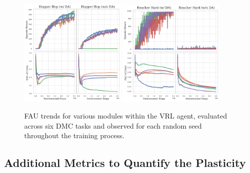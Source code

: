 \begin{figure}[ht]
  \includegraphics[width=0.45\textwidth]{Figures/5Appendix/sing_UTD_hopper_hop.pdf}
  \includegraphics[width=0.45\textwidth]{Figures/5Appendix/sing_UTD_reacher_hard.pdf}
\caption{FAU trends for various modules within the VRL agent, evaluated across six DMC tasks and observed for each random seed throughout the training process.}
  \label{appendix_fig:FAU_seed}
\end{figure}

\newpage
\subsection{Additional Metrics to Quantify the Plasticity}

